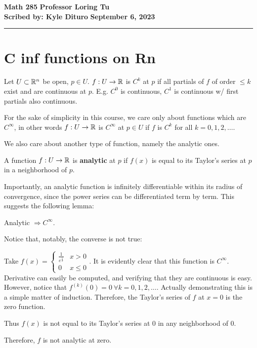 \documentclass[12pt, twosided]{article}
\begin{document}
\noindent \textbf{Math 285} \hfill \textbf{Professor Loring Tu} \\
\textbf{Scribed by: Kyle Dituro} \hfill \textbf{September 6\tht, 2023}\hrule
\vspace{.2in}

\section{C inf functions on Rn}

\begin{df}
  Let \(U \subset \mathbb{R}^n\) be open, \(p \in U\). \(f: U \to \mathbb{R}\) is \(C^k\) at \(p\) if all partials of \(f\) of order \(\leq k\) exist and are continuous at \(p\). E.g. \(C^0\) is continuous, \(C^1\) is continuous w/ first partials also continuous.
\end{df}

For the sake of simplicity in this course, we care only about functions which are \(C^\infty\), in other words \(f: U \to \mathbb{R}\) is \(C^\infty\) at \(p \in U\) if \(f\) is \(C^k\) for all \(k = 0, 1, 2, \ldots\).

We also care about another type of function, namely the analytic ones.

\begin{df}
  A function \(f: U \to \mathbb{R}\) is \textbf{analytic} at \(p\) if \(f(x)\) is equal to its Taylor's series at \(p\) in a neighborhood of \(p\).
\end{df}

Importantly, an analytic function is infinitely differentiable within its radius of convergence, since the power series can be differentiated term by term. This suggests the following lemma:

\begin{lm}
  Analytic \(\Rightarrow C^\infty\).
\end{lm}

Notice that, notably, the converse is not true:

\begin{exa}
  Take \(f(x) =
  \begin{cases}
    \frac{1}{e^{\frac{1}{x}}} & x > 0 \\
    0 & x \leq 0
  \end{cases}
  \). It is evidently clear that this function is \(C^\infty\). Derivative can easily be computed, and verifying that they are continuous is easy. However, notice that \(f^{(k)}(0) = 0\ \forall k = 0, 1, 2, \ldots\). Actually demonstrating this is a simple matter of induction. Therefore, the Taylor's series of \(f\) at \(x = 0\) is the zero function.

  Thus \(f(x)\) is not equal to its Taylor's series at \(0\) in any neighborhood of \(0\).

  Therefore, \(f\) is not analytic at zero.
\end{exa}
\end{document}
